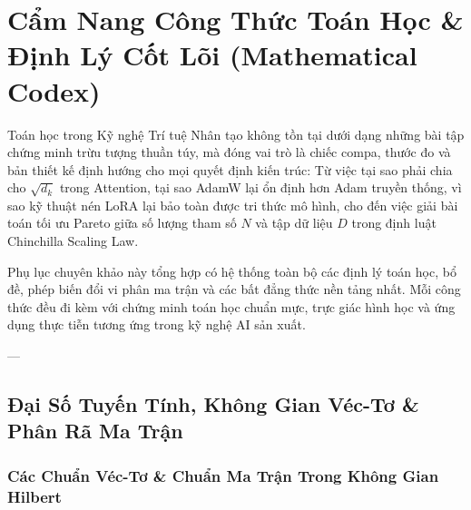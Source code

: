 
\chapter{Cẩm Nang Công Thức Toán Học \& Định Lý Cốt Lõi (Mathematical Codex)}
\label{ch:appendix-math-codex}

Toán học trong Kỹ nghệ Trí tuệ Nhân tạo không tồn tại dưới dạng những bài tập chứng minh trừu tượng thuần túy, mà đóng vai trò là chiếc compa, thước đo và bản thiết kế định hướng cho mọi quyết định kiến trúc: Từ việc tại sao phải chia cho $\sqrt{d_k}$ trong Attention, tại sao AdamW lại ổn định hơn Adam truyền thống, vì sao kỹ thuật nén LoRA lại bảo toàn được tri thức mô hình, cho đến việc giải bài toán tối ưu Pareto giữa số lượng tham số $N$ và tập dữ liệu $D$ trong định luật Chinchilla Scaling Law.

Phụ lục chuyên khảo này tổng hợp có hệ thống toàn bộ các định lý toán học, bổ đề, phép biến đổi vi phân ma trận và các bất đẳng thức nền tảng nhất. Mỗi công thức đều đi kèm với chứng minh toán học chuẩn mực, trực giác hình học và ứng dụng thực tiễn tương ứng trong kỹ nghệ AI sản xuất.

---

\section{Đại Số Tuyến Tính, Không Gian Véc-Tơ \& Phân Rã Ma Trận}
\label{sec:app-math-linalg}

\subsection{Các Chuẩn Véc-Tơ \& Chuẩn Ma Trận Trong Không Gian Hilbert}

